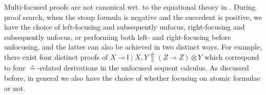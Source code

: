 \documentclass[runningheads]{llncs}
\newcommand{\tr}{\otimes \mathsf{R}}
\newcommand{\otR}{\tr}
\newcommand{\ot}{\otimes}
\newcommand{\lolli}{\multimap}
\newcommand{\I}{\mathsf{I}}
\newcommand{\up}{\Uparrow}
\begin{document}
Multi-focused proofs are not canonical wrt. to the equational theory in . During proof search, when the stoup formula is negative and the succedent is positive, we have the choice of left-focusing and subsequently unfocus, right-focusing and subsequently unfocus, or performing both left- and right-focusing before unfocusing, and the latter can also be achieved in two distinct ways.
For example, there exist four distinct proofs of $X \lolli \I \mid X , Y \up (Z \lolli Z) \ot Y$ which correspond to four $\circeq$-related derivations in the unfocused sequent calculus.
As discussed before, in general we also have the choice of whether focusing on atomic formulae or not. %
\end{document}
